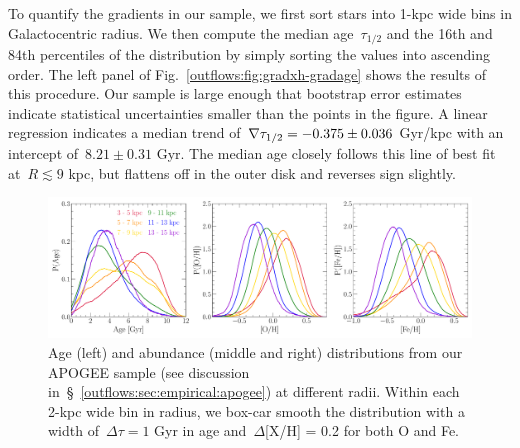 To quantify the gradients in our sample, we first sort stars into 1-kpc wide
bins in Galactocentric radius.
We then compute the median age~$\tau_{1/2}$ and the 16th and 84th percentiles
of the distribution by simply sorting the values into ascending order.
The left panel of Fig.~\ref{outflows:fig:gradxh-gradage} shows the results of
this procedure.
Our sample is large enough that bootstrap error estimates indicate statistical
uncertainties smaller than the points in the figure.
A linear regression indicates a median trend of~$\nabla\tau_{1/2} = -0.375 \pm 0.036$
Gyr/kpc with an intercept of~$8.21 \pm 0.31$ Gyr.
The median age closely follows this line of best fit at~$R \lesssim 9$ kpc, but
flattens off in the outer disk and reverses sign slightly.

\begin{landscape}
\begin{figure}
\centering
\includegraphics[scale = 0.55]{age_xh_dists.pdf}
\caption{
Age (left) and abundance (middle and right) distributions from our APOGEE
sample (see discussion in~\S~\ref{outflows:sec:empirical:apogee}) at different
radii.
Within each 2-kpc wide bin in radius, we box-car smooth the distribution with a
width of~$\Delta \tau = 1$ Gyr in age and~$\Delta$[X/H] = 0.2 for both O and
Fe.
}
\label{outflows:fig:age-xh-dists}
\end{figure}
\end{landscape}


